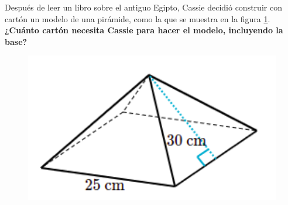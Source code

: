 \question[10] Después de leer un libro sobre el antiguo Egipto, Cassie decidió construir con cartón un modelo de una pirámide,
como la que se muestra en la figura \ref{fig:prob_verb_superficie_05}.
\textbf{¿Cuánto cartón necesita Cassie para hacer el modelo, incluyendo la base?}

\begin{minipage}{0.3\linewidth}
    \begin{figure}[H]
        \begin{center}
            \includegraphics[width=1\textwidth]{../images/prob_verb_superficie_05}
        \end{center}
        \caption{}
        \label{fig:prob_verb_superficie_05}
    \end{figure}
\end{minipage}
\begin{minipage}{0.7\linewidth}
\end{minipage}